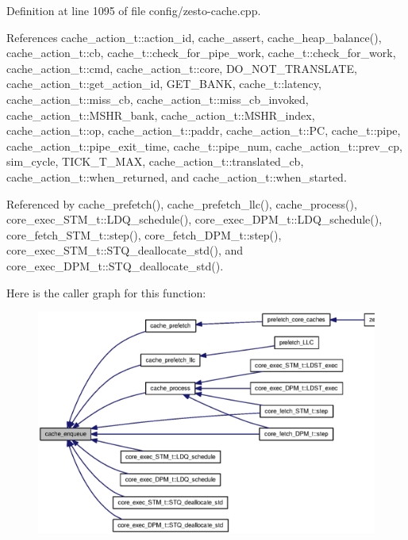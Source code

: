 Definition at line 1095 of file config/zesto-cache.cpp.

References cache\_\-action\_\-t::action\_\-id, cache\_\-assert, cache\_\-heap\_\-balance(), cache\_\-action\_\-t::cb, cache\_\-t::check\_\-for\_\-pipe\_\-work, cache\_\-t::check\_\-for\_\-work, cache\_\-action\_\-t::cmd, cache\_\-action\_\-t::core, DO\_\-NOT\_\-TRANSLATE, cache\_\-action\_\-t::get\_\-action\_\-id, GET\_\-BANK, cache\_\-t::latency, cache\_\-action\_\-t::miss\_\-cb, cache\_\-action\_\-t::miss\_\-cb\_\-invoked, cache\_\-action\_\-t::MSHR\_\-bank, cache\_\-action\_\-t::MSHR\_\-index, cache\_\-action\_\-t::op, cache\_\-action\_\-t::paddr, cache\_\-action\_\-t::PC, cache\_\-t::pipe, cache\_\-action\_\-t::pipe\_\-exit\_\-time, cache\_\-t::pipe\_\-num, cache\_\-action\_\-t::prev\_\-cp, sim\_\-cycle, TICK\_\-T\_\-MAX, cache\_\-action\_\-t::translated\_\-cb, cache\_\-action\_\-t::when\_\-returned, and cache\_\-action\_\-t::when\_\-started.

Referenced by cache\_\-prefetch(), cache\_\-prefetch\_\-llc(), cache\_\-process(), core\_\-exec\_\-STM\_\-t::LDQ\_\-schedule(), core\_\-exec\_\-DPM\_\-t::LDQ\_\-schedule(), core\_\-fetch\_\-STM\_\-t::step(), core\_\-fetch\_\-DPM\_\-t::step(), core\_\-exec\_\-STM\_\-t::STQ\_\-deallocate\_\-std(), and core\_\-exec\_\-DPM\_\-t::STQ\_\-deallocate\_\-std().

Here is the caller graph for this function:\nopagebreak
\begin{figure}[H]
\begin{center}
\leavevmode
\includegraphics[width=420pt]{zesto-cache_8h_0831369c0f015a2e350b71f2fc445c70_icgraph}
\end{center}
\end{figure}
